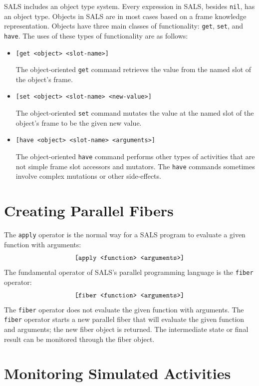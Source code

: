 SALS includes an object type system.  Every expression in SALS,
besides {\tt nil}, has an object type.  Objects in SALS are in most
cases based on a frame knowledge representation.  Objects have three
main classes of functionality: {\tt get}, {\tt set}, and {\tt have}.
The uses of these types of functionality are as follows:
\begin{itemize}
\item {\tt [get <object> <slot-name>]}

The object-oriented {\tt get} command retrieves the value from the
named slot of the object's frame.
\item {\tt [set <object> <slot-name> <new-value>]}

The object-oriented {\tt set} command mutates the value at the named
slot of the object's frame to be the given new value.
\item {\tt [have <object> <slot-name> <arguments>]}

The object-oriented {\tt have} command performs other types of
activities that are not simple frame slot accessors and mutators.  The
{\tt have} commands sometimes involve complex mutations or other
side-effects.
\end{itemize}

\section{Creating Parallel Fibers}

The {\tt apply} operator is the normal way for a SALS program to
evaluate a given function with arguments:
\begin{equation*}
\text{\tt [apply <function> <arguments>]}
\end{equation*}
The fundamental operator of SALS's parallel programming language is
the {\tt fiber} operator:
\begin{equation*}
\text{\tt [fiber <function> <arguments>]}
\end{equation*}
The {\tt fiber} operator does not evaluate the given function with
arguments.  The {\tt fiber} operator starts a new parallel fiber that
will evaluate the given function and arguments; the new fiber object
is returned.  The intermediate state or final result can be monitored
through the fiber object.

\section{Monitoring Simulated Activities}

